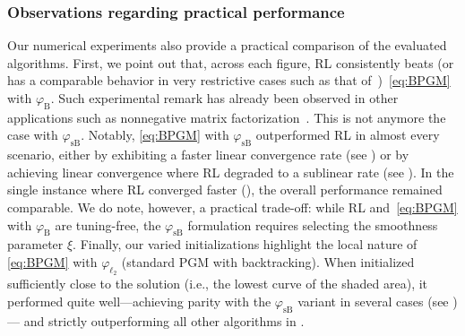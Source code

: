 \documentclass[11pt]{amsart}
\begin{document}
\subsubsection{Observations regarding practical performance} Our numerical experiments also provide a practical comparison of the evaluated algorithms. First, we point out that, across each figure, RL consistently beats (or has a comparable behavior in very restrictive cases such as that of~)~\cref{eq:BPGM} with $\varphi_{\mathrm{B}}$. Such experimental remark has already been observed in other applications such as nonnegative matrix factorization~\cite{Hien2021}. This is not anymore the case with $\varphi_{\mathrm{sB}}$. Notably, \cref{eq:BPGM} with $\varphi_{\mathrm{sB}}$ outperformed RL in almost every scenario, either by exhibiting a faster linear convergence rate (see ) or by achieving linear convergence where RL degraded to a sublinear rate (see ). In the single instance where RL converged faster (), the overall performance remained comparable. We do note, however, a practical trade-off: while RL and~\cref{eq:BPGM} with $\varphi_{\mathrm{B}}$ are tuning-free, the $\varphi_{\mathrm{sB}}$ formulation requires selecting the smoothness parameter $\xi$. Finally, our varied initializations highlight the local nature of \cref{eq:BPGM} with $\varphi_{\ell_2}$ (standard PGM with backtracking). When initialized sufficiently close to the solution (i.e., the lowest curve of the shaded area), it performed quite well---achieving parity with the $\varphi_{\mathrm{sB}}$ variant in several cases (see )--- and strictly outperforming all other algorithms in .
\end{document}

